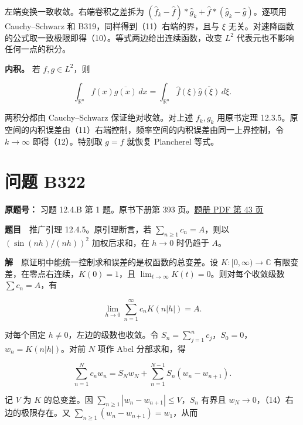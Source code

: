 \documentclass[11pt,a4paper]{article}
\begin{document}
左端变换一致收敛。右端卷积之差拆为
\((\widehat f_k-\widehat f)*\widehat g_k+\widehat f*(\widehat g_k-\widehat g)\)。逐项用
Cauchy--Schwarz 和 B319，同样得到（11）右端的界，且与 \(\xi\)
无关。对速降函数的公式取一致极限即得（10）。等式两边给出连续函数，改变
\(L^2\) 代表元也不影响任何一点的积分。

\textbf{内积。} 若 \(f,g\in L^2\)，则

\begin{equation}
\int_{\mathbb R^n} f(x)\overline{g(x)}\,dx
=\int_{\mathbb R^n}\widehat f(\xi)\overline{\widehat g(\xi)}\,d\xi .\tag{12}
\end{equation}

两积分都由 Cauchy--Schwarz 保证绝对收敛。对上述 \(f_k,g_k\) 用原书定理
12.3.5。原空间的内积误差由（11）右端控制，频率空间的内积误差由同一上界控制，令
\(k\to\infty\) 即得（12）。特别取 \(g=f\) 就恢复 Plancherel 等式。

\section{问题 B322}\label{ux95eeux9898-b322}

\textbf{原题号：} 习题 12.4.B 第 1 题。原书下册第 393
页。\href{https://zj139.github.io/math-notes/files/problems/楼分析习题-v2.pdf\#page=43}{题册
PDF 第 43 页}

\textbf{题目}　推广引理 12.4.5。原引理断言，若
\(\sum_{n\ge1}c_n=A\)，则以 \((\sin(nh)/(nh))^2\) 加权后求和，在
\(h\to0\) 时仍趋于 \(A\)。

\textbf{解}　原证明中能统一控制求和误差的是权函数的总变差。设
\(K:[0,\infty)\to\mathbb C\) 有限变差，在零点右连续，\(K(0)=1\)，且
\(\lim_{t\to\infty}K(t)=0\)。则对每个收敛级数 \(\sum c_n=A\)，有

\begin{equation}
\lim_{h\to0}\sum_{n=1}^\infty c_nK(n|h|)=A .\tag{13}
\end{equation}

对每个固定 \(h\ne0\)，左边的级数也收敛。令
\(S_n=\sum_{j=1}^n c_j\)，\(S_0=0\)，\(w_n=K(n|h|)\)。对前 \(N\) 项作
Abel 分部求和，得

\begin{equation}
\sum_{n=1}^N c_n w_n
=S_N w_N+\sum_{n=1}^{N-1}S_n(w_n-w_{n+1}) .\tag{14}
\end{equation}

记 \(V\) 为 \(K\) 的总变差。因
\(\sum_{n\ge1}|w_n-w_{n+1}|\leq V\)，\(S_n\) 有界且
\(w_N\to0\)，（14）右边的极限存在。又
\(\sum_{n\ge1}(w_n-w_{n+1})=w_1\)，从而
\end{document}
